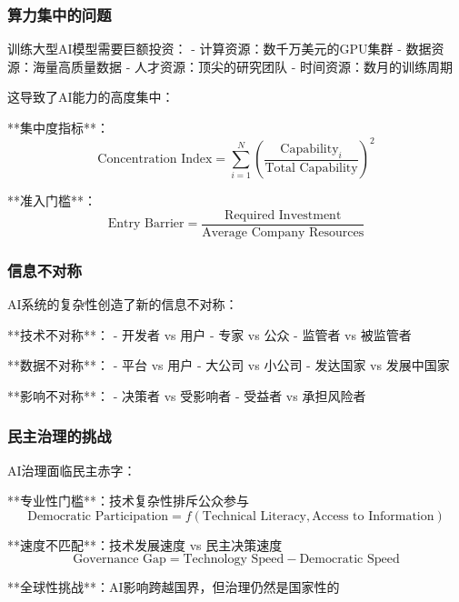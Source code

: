 \subsubsection{算力集中的问题}

训练大型AI模型需要巨额投资：
- 计算资源：数千万美元的GPU集群
- 数据资源：海量高质量数据
- 人才资源：顶尖的研究团队
- 时间资源：数月的训练周期

这导致了AI能力的高度集中：

**集中度指标**：
\begin{equation}
\text{Concentration Index} = \sum_{i=1}^N \left(\frac{\text{Capability}_i}{\text{Total Capability}}\right)^2
\end{equation}

**准入门槛**：
\begin{equation}
\text{Entry Barrier} = \frac{\text{Required Investment}}{\text{Average Company Resources}}
\end{equation}

\subsubsection{信息不对称}

AI系统的复杂性创造了新的信息不对称：

**技术不对称**：
- 开发者 vs 用户
- 专家 vs 公众
- 监管者 vs 被监管者

**数据不对称**：
- 平台 vs 用户
- 大公司 vs 小公司
- 发达国家 vs 发展中国家

**影响不对称**：
- 决策者 vs 受影响者
- 受益者 vs 承担风险者

\subsubsection{民主治理的挑战}

AI治理面临民主赤字：

**专业性门槛**：技术复杂性排斥公众参与
\begin{equation}
\text{Democratic Participation} = f(\text{Technical Literacy}, \text{Access to Information})
\end{equation}

**速度不匹配**：技术发展速度 vs 民主决策速度
\begin{equation}
\text{Governance Gap} = \text{Technology Speed} - \text{Democratic Speed}
\end{equation}

**全球性挑战**：AI影响跨越国界，但治理仍然是国家性的

